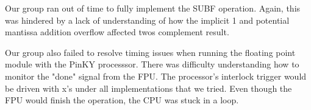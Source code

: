 \documentclass[conference]{IEEEtran}
\begin{document}
    Our group ran out of time to fully implement the SUBF operation. Again, this was hindered by a lack of understanding of how the implicit 1 and potential mantissa addition overflow affected twos complement result. 
    
    Our group also failed to resolve timing issues when running the floating point module with the PinKY processsor. There was difficulty understanding how to monitor the "done" signal from the FPU. The processor's interlock trigger would be driven with x's under all implementations that we tried. Even though the FPU would finish the operation, the CPU was stuck in a loop.
\end{document}
